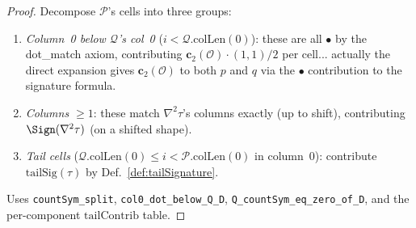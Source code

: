 \begin{proof}
  \leanok
  Decompose $\mathcal{P}$'s cells into three groups:
  \begin{enumerate}
    \item \emph{Column~0 below $\mathcal{Q}$'s col~0} ($i < \mathcal{Q}.\mathrm{colLen}(0)$): these are all $\bullet$ by the dot\_match axiom, contributing $\mathbf{c}_2(\mathcal{O}) \cdot (1, 1) / 2$ per cell... actually the direct expansion gives $\mathbf{c}_2(\mathcal{O})$ to both $p$ and $q$ via the $\bullet$ contribution to the signature formula.
    \item \emph{Columns $\geq 1$}: these match $\nabla^2\tau$'s columns exactly (up to shift), contributing $\Sign(\nabla^2\tau)$ (on a shifted shape).
    \item \emph{Tail cells} ($\mathcal{Q}.\mathrm{colLen}(0) \leq i < \mathcal{P}.\mathrm{colLen}(0)$ in column~0): contribute $\mathrm{tailSig}(\tau)$ by Def.~\ref{def:tailSignature}.
  \end{enumerate}
  Uses \texttt{countSym\_split}, \texttt{col0\_dot\_below\_Q\_D}, \texttt{Q\_countSym\_eq\_zero\_of\_D}, and the per-component $\mathrm{tailContrib}$ table.
\end{proof}















